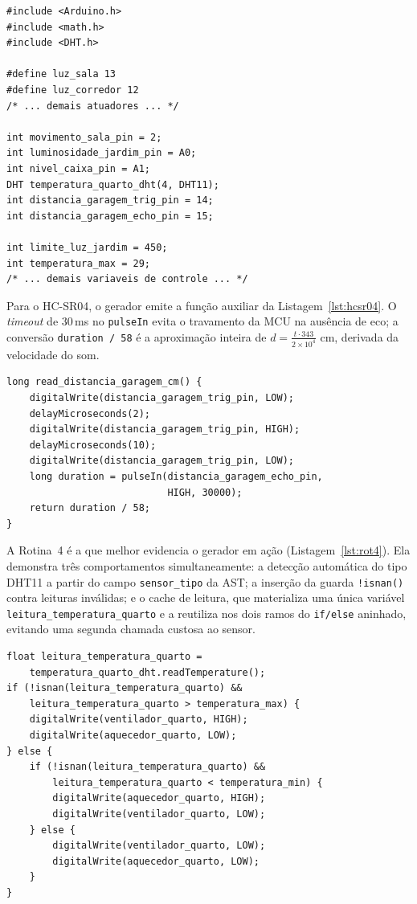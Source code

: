 \documentclass[conference]{IEEEtran}
\begin{document}
\begin{lstlisting}[style=csmall,caption={Preâmbulo e declarações globais gerados (trecho).},label={lst:preambulo}]
#include <Arduino.h>
#include <math.h>
#include <DHT.h>

#define luz_sala 13
#define luz_corredor 12
/* ... demais atuadores ... */

int movimento_sala_pin = 2;
int luminosidade_jardim_pin = A0;
int nivel_caixa_pin = A1;
DHT temperatura_quarto_dht(4, DHT11);
int distancia_garagem_trig_pin = 14;
int distancia_garagem_echo_pin = 15;

int limite_luz_jardim = 450;
int temperatura_max = 29;
/* ... demais variaveis de controle ... */
\end{lstlisting}

Para o HC-SR04, o gerador emite a função auxiliar da
Listagem~\ref{lst:hcsr04}. O \emph{timeout} de 30\,ms no \texttt{pulseIn}
evita o travamento da MCU na ausência de eco; a conversão
\texttt{duration / 58} é a aproximação inteira de
$d = \frac{t \cdot 343}{2 \times 10^{4}}$ cm, derivada da velocidade do som.

\begin{lstlisting}[style=csmall,caption={Função auxiliar gerada para o HC-SR04.},label={lst:hcsr04}]
long read_distancia_garagem_cm() {
    digitalWrite(distancia_garagem_trig_pin, LOW);
    delayMicroseconds(2);
    digitalWrite(distancia_garagem_trig_pin, HIGH);
    delayMicroseconds(10);
    digitalWrite(distancia_garagem_trig_pin, LOW);
    long duration = pulseIn(distancia_garagem_echo_pin,
                            HIGH, 30000);
    return duration / 58;
}
\end{lstlisting}

A Rotina~4 é a que melhor evidencia o gerador em ação
(Listagem~\ref{lst:rot4}). Ela demonstra três comportamentos
simultaneamente: a detecção automática do tipo DHT11 a partir do campo
\texttt{sensor\_tipo} da AST; a inserção da guarda \texttt{!isnan()} contra
leituras inválidas; e o cache de leitura, que materializa uma única
variável \texttt{leitura\_temperatura\_quarto} e a reutiliza nos dois ramos
do \texttt{if/else} aninhado, evitando uma segunda chamada custosa ao
sensor.

\begin{lstlisting}[style=csmall,caption={Rotina 4 gerada --- DHT11 com if/else aninhado e cache.},label={lst:rot4}]
float leitura_temperatura_quarto =
    temperatura_quarto_dht.readTemperature();
if (!isnan(leitura_temperatura_quarto) &&
    leitura_temperatura_quarto > temperatura_max) {
    digitalWrite(ventilador_quarto, HIGH);
    digitalWrite(aquecedor_quarto, LOW);
} else {
    if (!isnan(leitura_temperatura_quarto) &&
        leitura_temperatura_quarto < temperatura_min) {
        digitalWrite(aquecedor_quarto, HIGH);
        digitalWrite(ventilador_quarto, LOW);
    } else {
        digitalWrite(ventilador_quarto, LOW);
        digitalWrite(aquecedor_quarto, LOW);
    }
}
\end{lstlisting}
\end{document}
